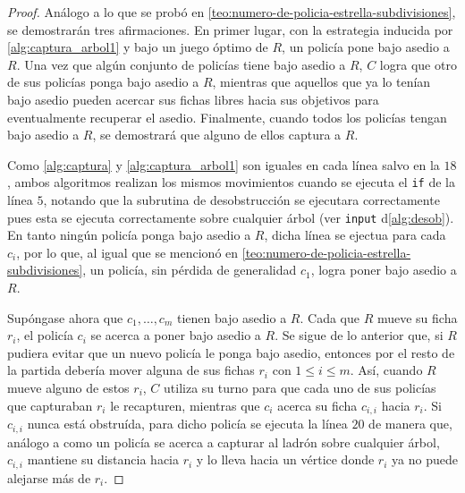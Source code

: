 \begin{proof}
    An\'alogo a lo que se prob\'o en
    \cref{teo:numero-de-policia-estrella-subdivisiones}, se demostrar\'an tres
    afirmaciones.  En primer lugar, con la estrategia inducida por
    \cref{alg:captura_arbol1} y bajo un juego \'optimo de $R$, un polic\'ia pone
    bajo asedio a $R$.   Una vez que alg\'un conjunto de polic\'ias tiene bajo
    asedio a $R$, $C$ logra que otro de sus polic\'ias ponga bajo asedio a $R$,
    mientras que aquellos que ya lo ten\'ian bajo asedio pueden acercar sus
    fichas libres hacia sus objetivos para eventualmente recuperar el asedio.
    Finalmente, cuando todos los polic\'ias tengan bajo asedio a $R$, se
    demostrar\'a que alguno de ellos captura a $R$.
    
    Como \cref{alg:captura} y \cref{alg:captura_arbol1} son iguales en cada
    l\'inea salvo en la $18$, ambos algoritmos realizan los mismos movimientos
    cuando se ejecuta el \texttt{if} de la l\'inea $5$, notando que la subrutina
    de desobstrucci\'on se ejecutara correctamente pues esta se ejecuta
    correctamente sobre cualquier \'arbol (ver \texttt{input}
    d\cref{alg:desob}). En tanto ning\'un polic\'ia ponga bajo asedio a $R$,
    dicha l\'inea se ejectua para cada $c_i$, por lo que, al igual que se
    mencion\'o en \cref{teo:numero-de-policia-estrella-subdivisiones}, un
    polic\'ia, sin p\'erdida de generalidad $c_1$, logra poner bajo asedio a
    $R$.
    
    Sup\'ongase ahora que $c_1,\dots, c_m$ tienen bajo asedio a $R$. Cada que
    $R$ mueve su ficha $r_i$, el polic\'ia $c_i$ se acerca a poner bajo asedio a
    $R$.   Se sigue de lo anterior que, si $R$ pudiera evitar que un nuevo
    polic\'ia le ponga bajo asedio, entonces por el resto de la partida
    deber\'ia mover alguna de sus fichas $r_i$ con $1\leq i \leq m$. As\'i,
    cuando $R$ mueve alguno de estos $r_i$, $C$ utiliza su turno para que cada
    uno de sus polic\'ias que capturaban $r_i$ le recapturen, mientras que $c_i$
    acerca su ficha $c_{i,i}$ hacia $r_i$. Si $c_{i,i}$ nunca est\'a
    obstru\'ida, para dicho polic\'ia se ejecuta la l\'inea $20$ de manera que,
    an\'alogo a como un polic\'ia se acerca a capturar al ladr\'on sobre
    cualquier \'arbol, $c_{i,i}$ mantiene su distancia hacia $r_i$ y lo lleva
    hacia un v\'ertice donde $r_i$ ya no puede alejarse m\'as de $r_i$.
    

\end{proof}
